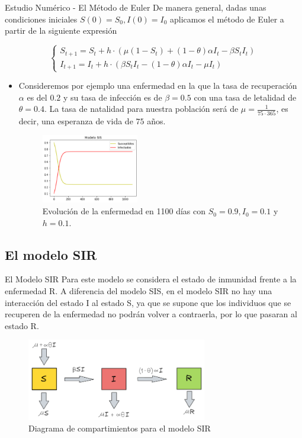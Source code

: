 \documentclass[9pt]{beamer}
\begin{document}
\begin{frame}{Estudio Numérico - El Método de Euler}
De manera general, dadas unas condiciones iniciales $S(0)=S_0,I(0)=I_0$ aplicamos el método de Euler a partir de la siguiente expresión

$$\left\{\begin{array}{l}
S_{t+1} = S_t + h\cdot(\mu(1 - S_t) + (1 - \theta)\alpha I_t - \beta S_t I_t ) \\
I_{t+1} = I_t + h\cdot(\beta S_t I_t - (1 - \theta)\alpha I_t - \mu I_t)
\end{array}\right.$$
\begin{itemize}
    \item Consideremos por ejemplo una enfermedad en la que la tasa de recuperación $\alpha$ es del $0.2$ y su tasa de infección es de $\beta=0.5$ con una tasa de letalidad de $\theta=0.4$. La tasa de natalidad para nuestra población será de $\mu=\frac{1}{75\cdot365}$, es decir, una esperanza de vida de $75$ años.
    
    \begin{figure}[h]
      \centering
        \includegraphics[width=0.4\textwidth]{Imagenes/ex1SIS.PNG}
      \caption{Evolución de la enfermedad en 1100 días con $S_0=0.9,I_0=0.1$ y $h=0.1$.}
      \label{fig:Ejemplo 1 - SIS}
    \end{figure}
\end{itemize}
\end{frame}

\subsection{El modelo SIR}
\begin{frame}{El Modelo SIR}
Para este modelo se considera el estado de inmunidad frente a la enfermedad R. A diferencia del modelo SIS, en el modelo SIR no hay una interacción del estado I al estado S, ya que se supone que los individuos que se recuperen de la enfermedad no podrán volver a contraerla, por lo que pasaran al estado R. 

\begin{figure}[h]
  \centering
    \includegraphics[width=0.7\textwidth]{Imagenes/SIR_compartimientos.PNG}
  \caption{Diagrama de compartimientos para el modelo SIR}
  \label{fig:diagrama SIR}
\end{figure}
\end{frame}
\end{document}

